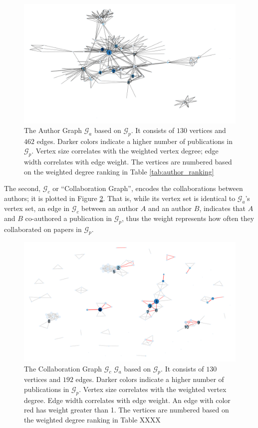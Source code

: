 \documentclass[11pt,a4paper]{book}
\theoremstyle{definition}
\theoremstyle{definition}
\theoremstyle{definition}
\theoremstyle{remark}
\newcommand{\pgraph}{\mathcal{G}_{p}}
\newcommand{\agraph}{\mathcal{G}_{a}}
\newcommand{\cgraph}{\mathcal{G}_{c}}
\begin{document}
\begin{figure}[h!]
\includegraphics[width=\textwidth]{author_graph.png}
\caption{The Author Graph  $\agraph$ based on $\pgraph$. It consists of  $130$ vertices and $462$ edges. 
Darker colors indicate a higher number of publications in $\pgraph$. Vertex size correlates with the weighted vertex degree; 
edge width correlates with edge weight. The vertices are numbered based on the weighted degree ranking in Table \ref{tab:author_ranking}}
\label{fig:agraph-actual_graph}
\end{figure}


The second, $\cgraph$ or ``Collaboration Graph'', encodes the collaborations between authors; it is plotted in Figure \ref{fig:cgraph-actual_graph}. That is, while its vertex set is identical to $\agraph$'s vertex set, an edge in $\cgraph$ between an author $A$ and an author $B$, indicates that $A$ and $B$ co-authored a publication in $\pgraph$, thus the weight represents how often they collaborated on papers in $\pgraph$. 



\begin{figure}[h!]
\includegraphics[width=\textwidth]{collab_graph.png}
\caption{The Collaboration Graph  $\cgraph$ $\agraph$ based on $\pgraph$. It consists of  $130$ vertices and $192$ edges. 
Darker colors indicate a higher number of publications in $\pgraph$. Vertex size correlates with the weighted vertex degree.
Edge width correlates with edge weight. An edge with color red has weight greater than 1. The vertices are numbered based on the weighted degree ranking in Table XXXX}
\label{fig:cgraph-actual_graph}
\end{figure}
\end{document}
